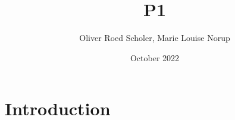 \documentclass{article}
\title{P1}
\author{Oliver Roed Scholer, Marie Louise Norup}
\date{October 2022}
\begin{document}
\maketitle

\section{Introduction}
\end{document}
